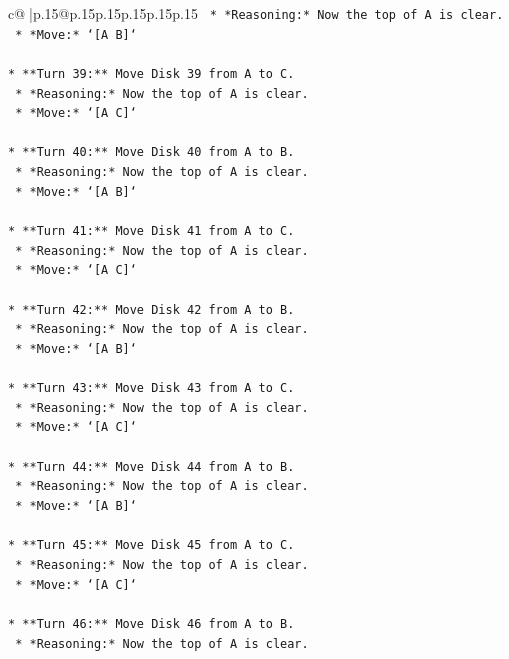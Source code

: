 \documentclass{article}
\begin{document}
{\begin{supertabular}{c@{$\;$}|p{.15\linewidth}@{}p{.15\linewidth}p{.15\linewidth}p{.15\linewidth}p{.15\linewidth}p{.15\linewidth}}
{{{\texttt{    *   *Reasoning:* Now the top of A is clear.} \\
\texttt{    *   *Move:* `{[}A B{]}`} \\
\\ 
\texttt{*   **Turn 39:** Move Disk 39 from A to C.} \\
\texttt{    *   *Reasoning:* Now the top of A is clear.} \\
\texttt{    *   *Move:* `{[}A C{]}`} \\
\\ 
\texttt{*   **Turn 40:** Move Disk 40 from A to B.} \\
\texttt{    *   *Reasoning:* Now the top of A is clear.} \\
\texttt{    *   *Move:* `{[}A B{]}`} \\
\\ 
\texttt{*   **Turn 41:** Move Disk 41 from A to C.} \\
\texttt{    *   *Reasoning:* Now the top of A is clear.} \\
\texttt{    *   *Move:* `{[}A C{]}`} \\
\\ 
\texttt{*   **Turn 42:** Move Disk 42 from A to B.} \\
\texttt{    *   *Reasoning:* Now the top of A is clear.} \\
\texttt{    *   *Move:* `{[}A B{]}`} \\
\\ 
\texttt{*   **Turn 43:** Move Disk 43 from A to C.} \\
\texttt{    *   *Reasoning:* Now the top of A is clear.} \\
\texttt{    *   *Move:* `{[}A C{]}`} \\
\\ 
\texttt{*   **Turn 44:** Move Disk 44 from A to B.} \\
\texttt{    *   *Reasoning:* Now the top of A is clear.} \\
\texttt{    *   *Move:* `{[}A B{]}`} \\
\\ 
\texttt{*   **Turn 45:** Move Disk 45 from A to C.} \\
\texttt{    *   *Reasoning:* Now the top of A is clear.} \\
\texttt{    *   *Move:* `{[}A C{]}`} \\
\\ 
\texttt{*   **Turn 46:** Move Disk 46 from A to B.} \\
\texttt{    *   *Reasoning:* Now the top of A is clear.} \\
}}}
\end{supertabular}}
\end{document}
